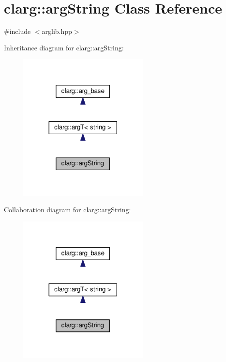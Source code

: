 \hypertarget{classclarg_1_1arg_string}{}\section{clarg\+:\+:arg\+String Class Reference}
\label{classclarg_1_1arg_string}


{\ttfamily \#include $<$arglib.\+hpp$>$}



Inheritance diagram for clarg\+:\+:arg\+String\+:\nopagebreak
\begin{figure}[H]
\begin{center}
\leavevmode
\includegraphics[width=185pt]{classclarg_1_1arg_string__inherit__graph}
\end{center}
\end{figure}


Collaboration diagram for clarg\+:\+:arg\+String\+:\nopagebreak
\begin{figure}[H]
\begin{center}
\leavevmode
\includegraphics[width=185pt]{classclarg_1_1arg_string__coll__graph}
\end{center}
\end{figure}
